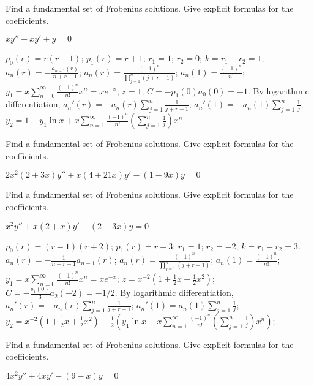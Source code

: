 \documentclass{ximera}
\begin{document}
\begin{problem}\label{exer:7.7.4}
Find
a fundamental set  of Frobenius solutions. Give explicit formulas for
the coefficients.

$xy''+xy'+y=0$

\begin{solution}
    $p_0(r)=r(r-1)$;
$p_1(r)=r+1$;
$r_1=1$; $r_2=0$; $k=r_1-r_2=1$;
$a_n(r)=-\frac{a_{n-1}(r)}{ n+r-1}$;
 $a_n(r)=\frac{(-1)^n}{\prod_{j=1}^n(j+r-1)}$;
$a_n(1)=\frac{(-1)^n}{ n!}$;
$y_1=x\sum_{n=0}^\infty\frac{(-1)^n}{ n!}x^n=xe^{-x}$;
$z=1$;
$C=-p_1(0)a_0(0)=-1$.
By logarithmic differentiation,
$a_n'(r)=-a_n(r)\sum_{j=1}^n\frac{1}{ j+r-1}$;
$a_n'(1)=-a_n(1)\sum_{j=1}^n\frac{1}{ j}$;
$y_2=1-y_1\ln x+x\sum_{n=1}^\infty\frac{(-1)^n}{
n!}\left(\sum_{j=1}^n\frac{1}{ j}\right)x^n$.
\end{solution}
\end{problem}

\begin{problem}\label{exer:7.7.5}
Find
a fundamental set  of Frobenius solutions. Give explicit formulas for
the coefficients.

$2x^2(2+3x)y''+x(4+21x)y'-(1-9x)y=0$
\end{problem}

\begin{problem}\label{exer:7.7.6}
Find
a fundamental set  of Frobenius solutions. Give explicit formulas for
the coefficients.

$x^2y''+x(2+x)y'-(2-3x)y=0$

\begin{solution}
    $p_0(r)=(r-1)(r+2)$;
$p_1(r)=r+3$;
$r_1=1$; $r_2=-2$; $k=r_1-r_2=3$.
$a_n(r)=-\frac{1}{ n+r-1}
a_{n-1}(r)$;
 $a_n(r)=\frac{(-1)^n}{\prod_{j=1}^n(j+r-1)}$;
$a_n(1)=\frac{(-1)^n}{ n!}$;
$y_1=x\sum_{n=0}^\infty \frac{(-1)^n}{ n!}x^n=xe^{-x}$;
$z=x^{-2}\left(1+\frac{1}{2}x+\frac{1}{2}x^2\right)$;
$C=-\frac{p_1(0)}{ 3}a_2(-2)=-1/2$.
By logarithmic differentiation,
$a_n'(r)=-a_n(r)\sum_{j=1}^n\frac{1}{ j+r-1}$;
$a_n'(1)=a_n(1)\sum_{j=1}^n\frac{1}{ j}$;
 $y_2=x^{-2}\left(1+\frac{1}{2}x+\frac{1}{2}x^2\right)-\frac{1}{2}
\left(y_1\ln x-x\sum_{n=1}^\infty\frac{(-1)^n}{
n!}\left(\sum_{j=1}^n\frac{1}{ j}\right)x^n\right)$;
\end{solution}
\end{problem}

\begin{problem}\label{exer:7.7.7}
Find
a fundamental set  of Frobenius solutions. Give explicit formulas for
the coefficients.

$4x^2y''+4xy'-(9-x)y=0$
\end{problem}
\end{document}
